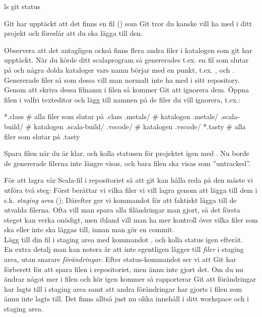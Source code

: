 \begin{Datorarbete}
	\begin{Code}
		ls
		git status
	\end{Code}

	Git har upptäckt att det finns en fil () som Git tror du kanske vill ha med i ditt projekt och föreslår att du ska lägga till den.

	Observera att det antagligen också finns flera andra filer i katalogen som git har upptäckt. När du körde ditt scalaprogram så genererades t.ex. en fil som slutar på  och några dolda kataloger vars namn börjar med en punkt, t.ex. ,  och . Genererade filer så som dessa vill man normalt inte ha med i sitt repository. Genom att skriva dessa filnamn i filen  så kommer Git att ignorera dem. Öppna filen  i valfri texteditor och lägg till namnen på de filer du vill ignorera, t.ex.:

	\begin{Code}
		*.class				# alla filer som slutar på .class
		.metals/			# katalogen .metals/
		.scala-build/		# katalogen .scala-build/
		.vscode/			# katalogen .vscode/
		*.tasty				# alla filer som slutar på .tasty
	\end{Code}


	Spara filen när du är klar, och kolla statusen för projektet igen med . Nu borde de genererade filerna inte längre visas, och bara filen  ska visas som ''untracked''.

	För att lagra vår Scala-fil i repositoriet så att git kan hålla reda på den måste vi utföra två steg: Först berättar vi vilka filer vi vill lagra genom att lägga till dem i s.k. \emph{staging area} (); Därefter ger vi kommandot  för att faktiskt lägga till de utvalda filerna. Ofta vill man spara alla filändringar man gjort, så det första steget kan verka onödigt, men ibland vill man ha mer kontroll över vilka filer som ska eller inte ska läggas till, innan man gör en commit.
	\\

	\code{[\ref{git-add}]} Lägg till din fil i staging area med kommandot , och kolla status igen efteråt.
	\\

	En extra detalj man kan notera är att  inte egentligen lägger till \emph{filer} i staging area, utan snarare \emph{förändringar}. Efter status-kommandot ser vi att Git har förberett för att spara filen i repositoriet, men ännu inte gjort det. Om du nu ändrar något mer i filen och kör  igen kommer så rapporterar Git att förändringar har lagts till i staging area samt att andra förändringar har gjorts i filen som ännu inte lagts till. Det finns alltså just nu olika innehåll i ditt workspace och i staging area.


\end{Datorarbete}
